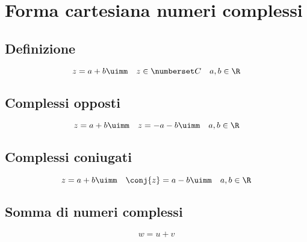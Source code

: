 \chapter{Forma cartesiana numeri complessi}
\section{Definizione}
\begin{equation}
z=a+b\uimm\quad z\in\Co\quad a,b\in\R
\end{equation} 
\begin{center}
	
\end{center}
\section{Complessi opposti}
\begin{equation}
z=a+b\uimm\quad\-z=-a-b\uimm\quad a,b\in\R
\end{equation}
\begin{center}
	
\end{center}
\section{Complessi coniugati}
\begin{equation}
z=a+b\uimm\quad\conj{z}=a-b\uimm\quad a,b\in\R
\end{equation}
\begin{center}
	
\end{center}
\section{Somma di numeri complessi}
\begin{equation}
w=u+v
\end{equation}
\begin{center}
	
\end{center}